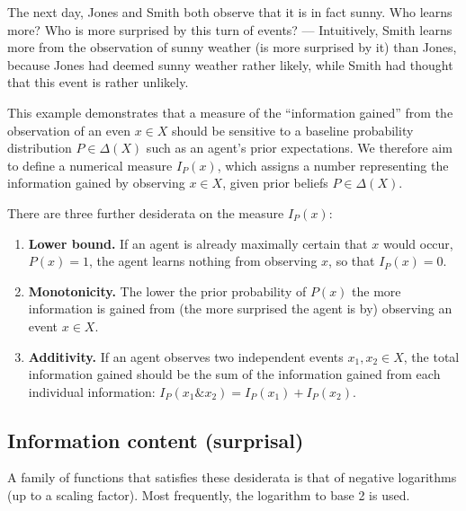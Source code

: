 \documentclass[nobib,nofonts]{tufte-handout}
\begin{document}
The next day, Jones and Smith both observe that it is in fact sunny.
Who learns more? Who is more surprised by this turn of events? ---
Intuitively, Smith learns more from the observation of sunny weather (is more surprised by it) than Jones, because Jones had deemed sunny weather rather likely, while Smith had thought that this event is rather unlikely.

This example demonstrates that a measure of the ``information gained'' from the observation of an even $x \in X$ should be sensitive to a baseline probability distribution $P \in \Delta(X)$ such as an agent's prior expectations.
We therefore aim to define a numerical measure $I_{P}(x)$, which assigns a number representing the information gained by observing $x \in X$, given prior beliefs $P \in \Delta(X)$.

There are three further desiderata on the measure $I_{P}(x)$:
\begin{enumerate}
  \item \textbf{Lower bound.} If an agent is already maximally certain that $x$ would occur, $P(x) = 1$, the agent learns nothing from observing $x$, so that $I_{P}(x)=0$.
  \item \textbf{Monotonicity.} The lower the prior probability of $P(x)$ the more information is gained from (the more surprised the agent is by) observing an event $x \in X$.
  \item \textbf{Additivity.} If an agent observes two independent events $x_{1}, x_{2} \in X$, the total information gained should be the sum of the information gained from each individual information: $I_{P}(x_{1} \& x_{2}) = I_{P}(x_{1}) + I_{P}(x_{2})$.
\end{enumerate}

\subsection{Information content (surprisal)}

A family of functions that satisfies these desiderata is that of negative logarithms (up to a scaling factor).
Most frequently, the logarithm to base 2 is used.
\end{document}
